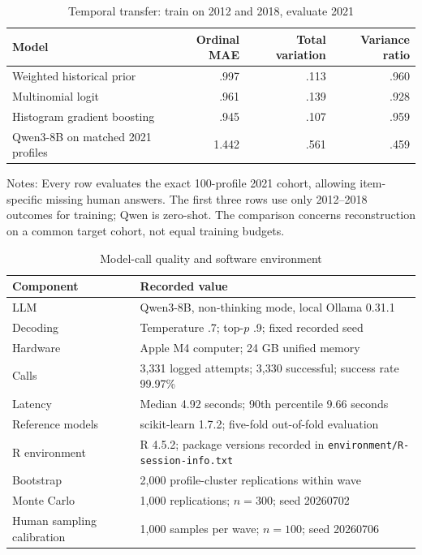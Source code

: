 \documentclass[11pt]{article}
\begin{document}
\begin{table}[!htbp]
\centering
\caption{Temporal transfer: train on 2012 and 2018, evaluate 2021}
\label{tab:s8-temporal}
\begin{threeparttable}
\small
\begin{tabular}{lrrr}
\toprule
Model & Ordinal MAE & Total variation & Variance ratio \\
\midrule
Weighted historical prior & .997 & .113 & .960 \\
Multinomial logit & .961 & .139 & .928 \\
Histogram gradient boosting & .945 & .107 & .959 \\
Qwen3-8B on matched 2021 profiles & 1.442 & .561 & .459 \\
\bottomrule
\end{tabular}
\begin{tablenotes}[flushleft]
\footnotesize
\item Notes: Every row evaluates the exact 100-profile 2021 cohort, allowing item-specific missing
human answers. The first three rows use only 2012--2018 outcomes for training; Qwen is zero-shot.
The comparison concerns reconstruction on a common target cohort, not equal training budgets.
\end{tablenotes}
\end{threeparttable}
\end{table}

\begin{table}[!htbp]
\centering
\caption{Model-call quality and software environment}
\label{tab:s9-computation}
\small
\begin{tabularx}{\textwidth}{lY}
\toprule
Component & Recorded value \\
\midrule
LLM & Qwen3-8B, non-thinking mode, local Ollama 0.31.1 \\
Decoding & Temperature .7; top-$p$ .9; fixed recorded seed \\
Hardware & Apple M4 computer; 24 GB unified memory \\
Calls & 3,331 logged attempts; 3,330 successful; success rate 99.97\% \\
Latency & Median 4.92 seconds; 90th percentile 9.66 seconds \\
Reference models & scikit-learn 1.7.2; five-fold out-of-fold evaluation \\
R environment & R 4.5.2; package versions recorded in \texttt{environment/R-session-info.txt} \\
Bootstrap & 2,000 profile-cluster replications within wave \\
Monte Carlo & 1,000 replications; $n=300$; seed 20260702 \\
Human sampling calibration & 1,000 samples per wave; $n=100$; seed 20260706 \\
\bottomrule
\end{tabularx}
\end{table}
\end{document}
